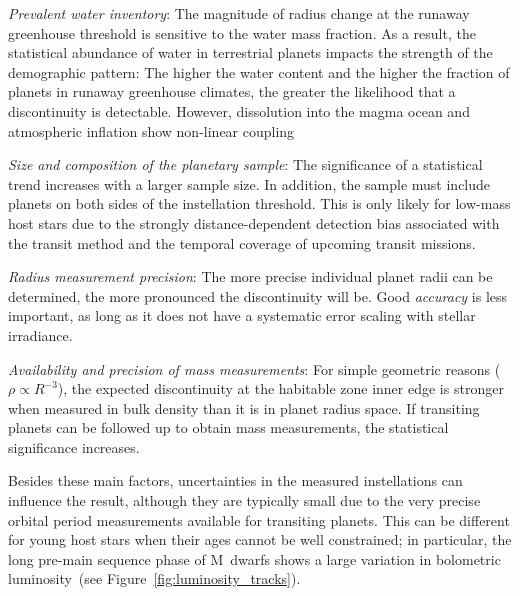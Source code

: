 \documentclass[twocolumn,twocolappendix,linenumbers]{aastex631}
\begin{document}
\textit{Prevalent water inventory}: The magnitude of radius change at the runaway greenhouse threshold is sensitive to the water mass fraction.
As a result, the statistical abundance of water in terrestrial planets impacts the strength of the demographic pattern:
The higher the water content and the higher the fraction of planets in runaway greenhouse climates, the greater the likelihood that a discontinuity is detectable.
However, dissolution into the magma ocean and atmospheric inflation show non-linear coupling

\textit{Size and composition of the planetary sample}: The significance of a statistical trend increases with a larger sample size.
In addition, the sample must include planets on both sides of the instellation threshold.
This is only likely for low-mass host stars due to the strongly distance-dependent detection bias associated with the transit method and the temporal coverage of upcoming transit missions.

\textit{Radius measurement precision}: The more precise individual planet radii can be determined, the more pronounced the discontinuity will be.
Good \textit{accuracy} is less important, as long as it does not have a systematic error scaling with stellar irradiance.

\textit{Availability and precision of mass measurements}: For simple geometric reasons ($\rho \propto R^{-3}$), the expected discontinuity at the habitable zone inner edge is stronger when measured in bulk density than it is in planet radius space.
If transiting planets can be followed up to obtain mass measurements, the statistical significance increases.

Besides these main factors, uncertainties in the measured instellations can influence the result, although they are typically small due to the very precise orbital period measurements available for transiting planets.
This can be different for young host stars when their ages cannot be well constrained; in particular, the long pre-main sequence phase of M~dwarfs shows a large variation in bolometric luminosity~(see Figure~\ref{fig:luminosity_tracks}).
\end{document}
